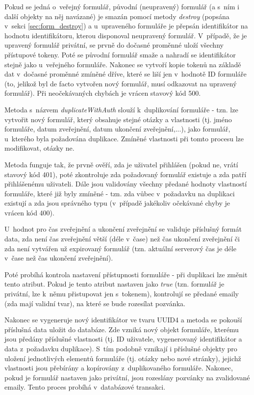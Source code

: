 			Pokud se jedná o~veřejný formulář, původní (neupravený) formulář (a s~ním i další objekty na něj navázané) je smazán pomocí metody \textit{destroy} (popsána v~sekci \ref{sec:form_destroy}) a u~upraveného formuláře je přepsán identifikátor na hodnotu identifikátoru, kterou disponoval neupravený formulář. V~případě, že je upravený formulář privátní, se prvně do dočasné proměnné uloží všechny přístupové tokeny. Poté se původní formulář smaže a nahradí se identifikátor stejně jako u~veřejného formuláře. Nakonec se vytvoří kopie tokenů na základě dat v~dočasné proměnné zmíněné dříve, které se liší jen v~hodnotě ID formuláře (to, jelikož byl de facto vytvořen nový formulář, musí odkazovat na upravený formulář). Při neočekávaných chybách je vrácen stavový kód 500.
			
			\label{sec:form_dupl}
			Metoda s~názvem \textit{duplicateWithAuth} slouží k~duplikování formuláře - tzn. lze vytvořit nový formulář, který obsahuje stejné otázky a vlastnosti (tj. jméno formuláře, datum zveřejnění, datum ukončení zveřejnění,...), jako formulář, u~kterého byla požadována duplikace. Zmíněné vlastnosti při tomto procesu lze modifikovat, otázky ne.
			
			Metoda funguje tak, že prvně ověří, zda je uživatel přihlášen (pokud ne, vrátí stavový kód 401), poté zkontroluje zda požadovaný formulář existuje a zda patří přihlášenému uživateli. Dále jsou validovány všechny předané hodnoty vlastností formuláře, které již byly zmíněné - tzn. zda vůbec v~požadavku na duplikaci existují a zda jsou správného typu (v~případě jakékoliv očekávané chyby je vrácen kód 400). 
			
			U~hodnot pro čas zveřejnění a ukončení zveřejnění se validuje příslušný formát data, zda není čas zveřejnění větší (déle v~čase) než čas ukončení zveřejnění či zda není vytvářen už expirovaný formulář (tzn. aktuální serverový čas je déle v~čase než čas ukončení zveřejnění). 
			
			Poté probíhá kontrola nastavení přístupnosti formuláře - při duplikaci lze změnit tento atribut. Pokud je tento atribut nastaven jako \textit{true} (tzn. formulář je privátní, lze k~němu přistupovat jen s~tokenem), kontrolují se předané emaily (zda mají validní tvar), na které se bude rozesílat pozvánka.
			
			Nakonec se vygeneruje nový identifikátor ve tvaru UUID4 a metoda se pokouší příslušná data uložit do databáze. Zde vzniká nový objekt formuláře, kterému jsou předány příslušné vlastnosti (tj. ID uživatele, vygenerovaný identifikátor a data z~požadavku duplikace). S~tím podobně vznikají i příslušné objekty pro uložení jednotlivých elementů formuláře (tj. otázky nebo nové stránky), jejichž vlastnosti jsou přebírány a kopírovány z~duplikovaného formuláře. Nakonec, pokud je formulář nastaven jako privátní, jsou rozeslány pozvánky na zvalidované emaily. Tento proces probíhá v~databázové transakci.
			
